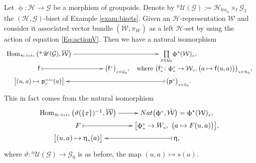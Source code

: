 \documentclass[11pt]{article}
\numberwithin{equation}{section}
\renewcommand{\hom}[3]{\mathrm{Hom}_{\Sscript{#1}}\left(#2, #3\right)}
\newcommand{\bara}[1]{\overline{#1}}
\newcommand{\Go}{\cG_{\Sscript{0}}}
\newcommand{\Ga}{\cG_{\Sscript{1}}}
\newcommand{\Ho}{\cH_{\Sscript{0}}}
\newcommand{\Wu}{\cW_{\Sscript{u}}}
\newcommand{\uU}{\mathscr{U}}
\newcommand{\cG}{{\mathcal G}}
\newcommand{\cH}{{\mathcal H}}
\newcommand{\cW}{{\mathcal W}}
\newcommand{\Sscript}[1]{\scriptscriptstyle{#1}}
\newcommand{\due}[3]{{}_{{#2 }} {#1}_{{ #3}} }
\begin{document}
\begin{Remark}\label{rem:HomSet} Let $\upphi\colon \cH \to \cG$ be a morphism of groupoids. Denote by ${}^{\Sscript{\upphi}}\uU(\cG):=\Ho \due \times {\Sscript{\upphi_0}}{ \Sscript{t}} \Ga$ the $(\cH,\cG)$-biset of Example \ref{exam:bisets}. Given an $\cH$-representation $\cW$ and consider it associated vector bundle $(\bara{\cW},\pi_{\Sscript{\cW}})$ as a left $\cH$-set by using the action of equation \eqref{Eq:actionV}. Then we have a natural isomorphism
\begin{gather*}
\xymatrix@R=0pt@C=20pt{ \hom{\cH\text{-}{\rm Sets}}{{
}^{\Sscript{\upphi}}\uU(\cG)}{\bara{\cW}} \ar@{->}^-{}[rr] & &
\underset{x \in \Go}{\prod} \upphi^{*}(\cW)_{\Sscript{x}},
\\ {\sf{f}} \ar@{|->}^-{}[rr] & & \big(
{\sf{f}}^{\Sscript{x}}\big)_{\Sscript{x \in \Go}}, \quad \text{where
} \big( {\sf{f}}^{\Sscript{x}}_{\Sscript{u}}\colon
\upphi^{\Sscript{x}}_{\Sscript{u}} \to \Wu, \big(a \mapsto
{\sf{f}}(u,a) \big) \big)_{\Sscript{u \in \Ho}}, \\
\big[ (u,a) \mapsto {\sf{p}}^{\Sscript{s(a)}}_{\Sscript{u}}(a)
\big]& & \big( {\sf{p}}^{\Sscript{x}}\big)_{\Sscript{x \in
\Go}}. \ar@{|->}^-{}[ll] }
\end{gather*}
This in fact comes from the natural isomorphism
\begin{gather*}
\xymatrix@R=0pt@C=20pt{ \hom{\cH\text{-}{\rm Sets}} {\vartheta(\{ x
\})^{-1}}{\bara{\cW}} \ar@{->}^-{}[r] & {\rm
Nat}\big(\upphi^{\Sscript{x}}, \tilde{\cW}\big) =
\upphi^{*}(\cW)_{\Sscript{x}},
\\ F \ar@{|->}^-{}[r] & \big[\upphi^{\Sscript{x}}_{\Sscript{u}} \to
W_{\Sscript{u}},\; \big( a \mapsto F(u, a)\big)\big], \\
\big[ (u,a) \mapsto \upeta_{\Sscript{u}}(a)\big] & \upeta,
\ar@{|->}^-{}[l] }
\end{gather*}
where $\vartheta\colon { }^{\Sscript{\upphi}}\uU(\cG) \to \Go$ is as before, the map $(u,a) \mapsto s(a)$.
\end{Remark}
\end{document}
